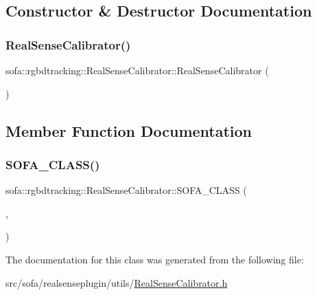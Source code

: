 \subsection{Constructor \& Destructor Documentation}
\mbox{\label{classsofa_1_1rgbdtracking_1_1_real_sense_calibrator_a4f171363d7cde684d2f84db2dcf0efe7}} 
\subsubsection{\texorpdfstring{Real\+Sense\+Calibrator()}{RealSenseCalibrator()}}
{\footnotesize\ttfamily sofa\+::rgbdtracking\+::\+Real\+Sense\+Calibrator\+::\+Real\+Sense\+Calibrator (\begin{DoxyParamCaption}{ }\end{DoxyParamCaption})\hspace{0.3cm}{\ttfamily [inline]}}



\subsection{Member Function Documentation}
\mbox{\label{classsofa_1_1rgbdtracking_1_1_real_sense_calibrator_a65aec8ab1fa6f8bda1ed0b496d818522}} 
\subsubsection{\texorpdfstring{S\+O\+F\+A\+\_\+\+C\+L\+A\+S\+S()}{SOFA\_CLASS()}}
{\footnotesize\ttfamily sofa\+::rgbdtracking\+::\+Real\+Sense\+Calibrator\+::\+S\+O\+F\+A\+\_\+\+C\+L\+A\+SS (\begin{DoxyParamCaption}\item[{\hyperlink{classsofa_1_1rgbdtracking_1_1_real_sense_calibrator}{Real\+Sense\+Calibrator}}]{,  }\item[{\hyperlink{classsofa_1_1rgbdtracking_1_1_real_sense_calibrator_af5eef0eeea5daa52e920b9d29e5575dc}{Inherited}}]{ }\end{DoxyParamCaption})}



The documentation for this class was generated from the following file\+:\begin{DoxyCompactItemize}
\item 
src/sofa/realsenseplugin/utils/\hyperlink{_real_sense_calibrator_8h}{Real\+Sense\+Calibrator.\+h}\end{DoxyCompactItemize}
